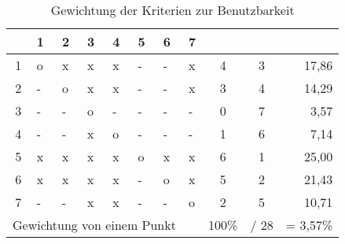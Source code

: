 \begin{table}[ht]
	\small
	\myfloatalign
	\begin{tabularx}{\textwidth}{cXXXXXXcccr} \hline
		\multicolumn{1}{c|}{} & 1 & 2 & 3 & 4 & 5 & 6 & \multicolumn{1}{c|}{7} & \tableheadline{$\sum$} & \tableheadline{Rang} & \spacedlowsmallcaps{Gewichtung {[}\%{]}} \\ \hline
		\multicolumn{1}{c|}{1} & o & x & x & x & - & - & \multicolumn{1}{l|}{x} & 4 & 3 & 17,86 \\
		\multicolumn{1}{c|}{2} & - & o & x & x & - & - & \multicolumn{1}{l|}{x} & 3 & 4 & 14,29 \\
		\multicolumn{1}{c|}{3} & - & - & o & - & - & - & \multicolumn{1}{l|}{-} & 0 & 7 & 3,57 \\
		\multicolumn{1}{c|}{4} & - & - & x & o & - & - & \multicolumn{1}{l|}{-} & 1 & 6 & 7,14 \\
		\multicolumn{1}{c|}{5} & x & x & x & x & o & x & \multicolumn{1}{l|}{x} & 6 & 1 & 25,00 \\
		\multicolumn{1}{c|}{6} & x & x & x & x & - & o & \multicolumn{1}{l|}{x} & 5 & 2 & 21,43 \\
		\multicolumn{1}{c|}{7} & \multicolumn{1}{l}{-} & \multicolumn{1}{l}{-} & \multicolumn{1}{l}{x} & \multicolumn{1}{l}{x} & \multicolumn{1}{l}{-} & \multicolumn{1}{l}{-} & \multicolumn{1}{l|}{o} & 2 & 5 & 10,71 \\ \hline
		\multicolumn{7}{r}{Gewichtung von einem Punkt} & & 100\% & / 28 & = 3,57\% \\ \hline
	\end{tabularx}
	\caption{Gewichtung der Kriterien zur Benutzbarkeit}
	\label{tbl:benutzbarkeit_gew}
\end{table}